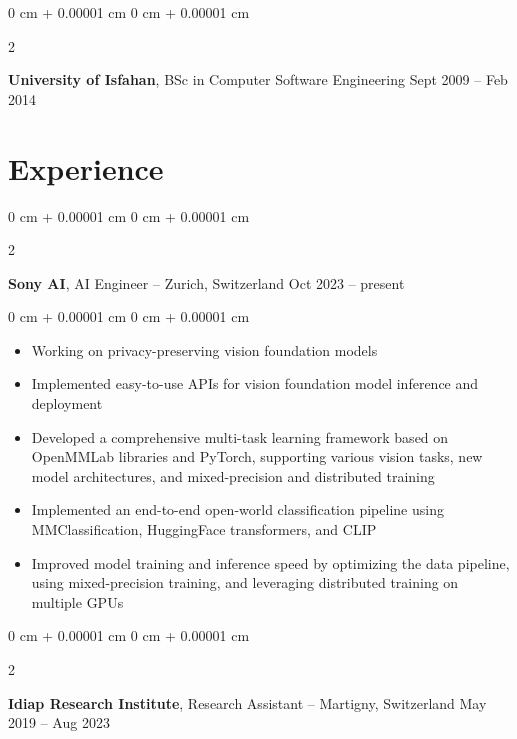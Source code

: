 \documentclass[10pt, a4paper]{article}
\newenvironment{highlights}{
    \begin{itemize}[
        topsep=0.10 cm,
        parsep=0.10 cm,
        partopsep=0pt,
        itemsep=0pt,
        leftmargin=0 cm + 10pt
    ]
}{
    \end{itemize}
} %
\newenvironment{onecolentry}{
    \begin{adjustwidth}{
        0 cm + 0.00001 cm
    }{
        0 cm + 0.00001 cm
    }
}{
    \end{adjustwidth}
} %
\newenvironment{twocolentry}[2][]{
    \onecolentry
    \def\secondColumn{#2}
    \setcolumnwidth{\fill, 4.5 cm}
    \begin{paracol}{2}
}{
    \switchcolumn \raggedleft \secondColumn
    \end{paracol}
    \endonecolentry
} %
\begin{document}
        \vspace{0.2 cm}

        \begin{twocolentry}{
            Sept 2009 – Feb 2014
        }
            \textbf{University of Isfahan}, BSc in Computer Software Engineering\end{twocolentry}




    
    \section{Experience}



        
        \begin{twocolentry}{
            Oct 2023 – present
        }
            \textbf{Sony AI}, AI Engineer -- Zurich, Switzerland\end{twocolentry}

        \vspace{0.10 cm}
        \begin{onecolentry}
            \begin{highlights}
                \item Working on privacy-preserving vision foundation models
                \item Implemented easy-to-use APIs for vision foundation model inference and deployment
                \item Developed a comprehensive multi-task learning framework based on OpenMMLab libraries and PyTorch, supporting various vision tasks, new model architectures, and mixed-precision and distributed training
                \item Implemented an end-to-end open-world classification pipeline using MMClassification, HuggingFace transformers, and CLIP
                \item Improved model training and inference speed by optimizing the data pipeline, using mixed-precision training, and leveraging distributed training on multiple GPUs
            \end{highlights}
        \end{onecolentry}


        \vspace{0.2 cm}

        \begin{twocolentry}{
            May 2019 – Aug 2023
        }
            \textbf{Idiap Research Institute}, Research Assistant -- Martigny, Switzerland\end{twocolentry}
\end{document}
